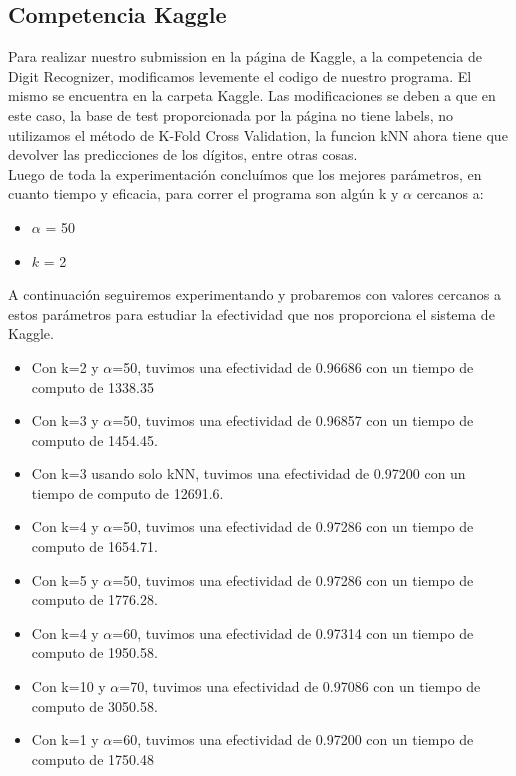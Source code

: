 \subsection{Competencia Kaggle}
Para realizar nuestro submission en la página de Kaggle, a la competencia de Digit Recognizer, modificamos levemente el codigo de nuestro programa. El mismo se encuentra en la carpeta Kaggle. Las modificaciones se deben a que en este caso, la base de test proporcionada por la página no tiene labels, no utilizamos el método de K-Fold Cross Validation, la funcion kNN ahora tiene que devolver las predicciones de los dígitos, entre otras cosas.\\
Luego de toda la experimentación concluímos que los mejores parámetros, en cuanto tiempo y eficacia, para correr el programa son algún k y $\alpha$ cercanos a:
\begin{itemize}
\item $\alpha$ = 50
\item $k$ = 2
\end{itemize}

A continuación seguiremos experimentando y probaremos con valores cercanos a estos parámetros para estudiar la efectividad que nos proporciona el sistema de Kaggle.
\begin{itemize}
	\item Con k=2 y $\alpha$=50, tuvimos una efectividad de 0.96686 con un tiempo de computo de 1338.35 
	\item Con k=3 y $\alpha$=50, tuvimos una efectividad de 0.96857 con un tiempo de computo de 1454.45.
	\item Con k=3 usando solo kNN, tuvimos una efectividad de 0.97200 con un tiempo de computo de 12691.6.
	\item Con k=4 y $\alpha$=50, tuvimos una efectividad de 0.97286 con un tiempo de computo de 1654.71.
	\item Con k=5 y $\alpha$=50, tuvimos una efectividad de 0.97286 con un tiempo de computo de 1776.28.
	\item Con k=4 y $\alpha$=60, tuvimos una efectividad de 0.97314 con un tiempo de computo de 1950.58.
	\item Con k=10 y $\alpha$=70, tuvimos una efectividad de 0.97086 con un tiempo de computo de 3050.58.
	\item Con k=1 y $\alpha$=60, tuvimos una efectividad de 0.97200 con un tiempo de computo de 1750.48

\end{itemize}

